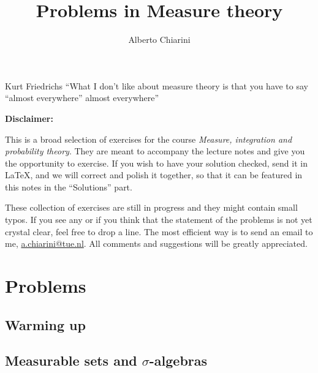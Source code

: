 \documentclass{easyclass}
\begin{document}
\begin{titlepage}
    \title{Problems in Measure theory}
    \author{Alberto Chiarini}
    \maketitle
\end{titlepage}

\begin{chapquote}[30pt]{Kurt Friedrichs}
``What I don't like about measure theory is that you have to say ``almost everywhere'' almost everywhere''
\end{chapquote}
\vfill
\textbf{Disclaimer:}

\vspace{0.5cm} 
This is a broad selection of exercises for the course \emph{Measure, integration and probability theory}. They are meant to accompany the lecture notes and give you the opportunity to exercise. If you wish to have your solution checked, send it in \LaTeX, and we will correct and polish it together, so that it can be featured in this notes in the ``Solutions'' part.

These collection of exercises are still in progress and they might contain small typos. If you see any or if you think that the statement of the problems is not yet crystal clear, feel free to drop a line. The most efficient way is to send an email to me, \href{mailto:a.chiarini@tue.nl}{a.chiarini@tue.nl}. All comments and suggestions will be greatly appreciated.

\newpage

\tableofcontents


\part{Problems}

\chapter{Warming up}


\chapter{Measurable sets and \texorpdfstring{$\sigma$}{}-algebras}


\end{document}
